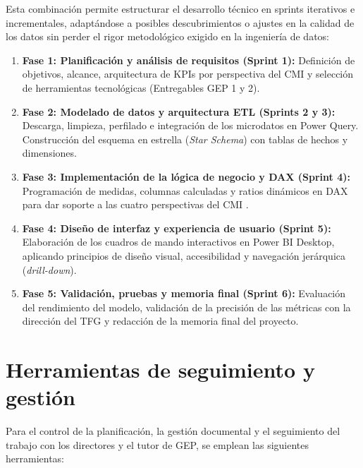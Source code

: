 \documentclass[12pt, a4paper, twoside]{report}
\begin{document}
Esta combinación permite estructurar el desarrollo técnico en sprints iterativos e incrementales, adaptándose a posibles descubrimientos o ajustes en la calidad de los datos sin perder el rigor metodológico exigido en la ingeniería de datos:

\begin{enumerate}
    \item \textbf{Fase 1: Planificación y análisis de requisitos (Sprint 1):} Definición de objetivos, alcance, arquitectura de KPIs por perspectiva del CMI y selección de herramientas tecnológicas (Entregables GEP 1 y 2).
    \item \textbf{Fase 2: Modelado de datos y arquitectura ETL (Sprints 2 y 3):} Descarga, limpieza, perfilado e integración de los microdatos en Power Query. Construcción del esquema en estrella (\textit{Star Schema}) con tablas de hechos y dimensiones.
    \item \textbf{Fase 3: Implementación de la lógica de negocio y DAX (Sprint 4):} Programación de medidas, columnas calculadas y ratios dinámicos en DAX para dar soporte a las cuatro perspectivas del CMI \cite{ferrari2016definitive}.
    \item \textbf{Fase 4: Diseño de interfaz y experiencia de usuario (Sprint 5):} Elaboración de los cuadros de mando interactivos en Power BI Desktop, aplicando principios de diseño visual, accesibilidad y navegación jerárquica (\textit{drill-down}).
    \item \textbf{Fase 5: Validación, pruebas y memoria final (Sprint 6):} Evaluación del rendimiento del modelo, validación de la precisión de las métricas con la dirección del TFG y redacción de la memoria final del proyecto.
\end{enumerate}

\section{Herramientas de seguimiento y gestión}
Para el control de la planificación, la gestión documental y el seguimiento del trabajo con los directores y el tutor de GEP, se emplean las siguientes herramientas:
\end{document}
